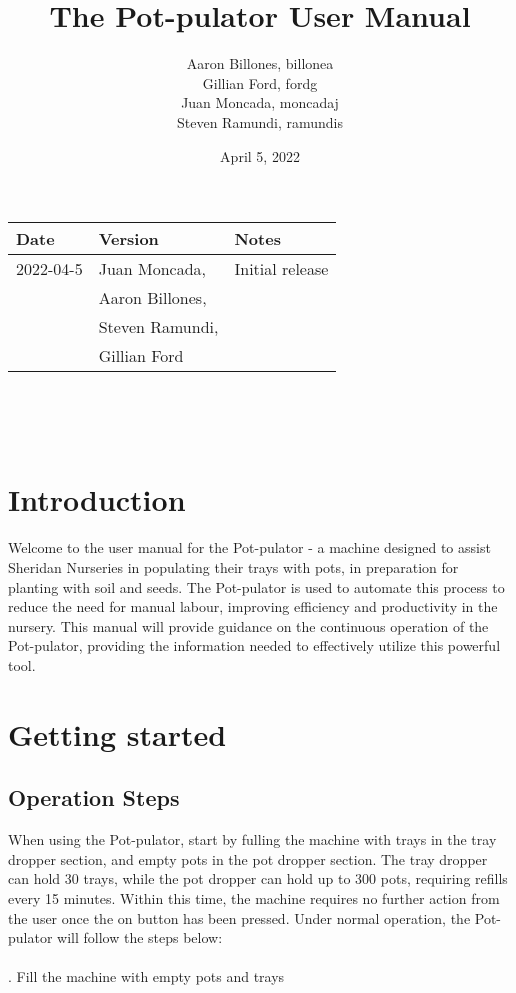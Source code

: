 \documentclass{article}
\title{The Pot-pulator User Manual}
\author{Aaron Billones, billonea\\Gillian Ford, fordg\\Juan Moncada, moncadaj\\Steven Ramundi, ramundis}
\date{April 5, 2022}
\begin{document}
\maketitle
\thispagestyle{empty}


\begin{tabularx}{\textwidth}{p{3cm}p{4cm}X}
    \toprule {\bf Date} & {\bf Version} & {\bf Notes}\\
    \midrule
    2022-04-5 & Juan Moncada,& Initial release\\&Aaron Billones,\\&Steven Ramundi,\\&Gillian Ford \\
    
    \bottomrule
\end{tabularx}

~\newpage

\tableofcontents

~\newpage


\section{Introduction}

Welcome to the user manual for the Pot-pulator - a machine designed to assist Sheridan Nurseries in populating their trays with pots, in preparation for planting with soil and seeds. The Pot-pulator is used to automate this process to reduce the need for manual labour, improving efficiency and productivity in the nursery. This manual will provide guidance on the continuous operation of the Pot-pulator, providing the information needed to effectively utilize this powerful tool.

\section{Getting started}

\subsection{Operation Steps}
When using the Pot-pulator, start by fulling the machine with trays in the tray dropper section, and empty pots in the pot dropper section. The tray dropper can hold 30 trays, while the pot dropper can hold up to 300 pots, requiring refills every 15 minutes. Within this time, the machine requires no further action from the user once the on button has been pressed. Under normal operation, the Pot-pulator will follow the steps below:
\\
\\ .	Fill the machine with empty pots and trays
\end{document}
